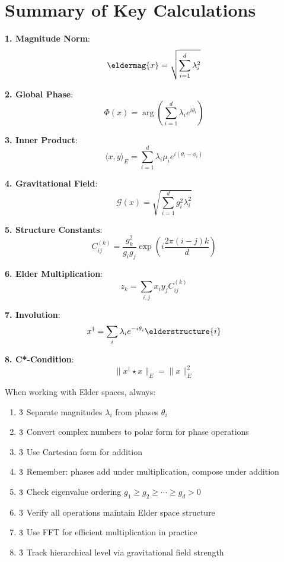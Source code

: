 \documentclass[12pt,a4paper]{article}
\newcommand{\checkmark}{\ding{51}}
\theoremstyle{definition}
\theoremstyle{remark}
\begin{document}
\newpage
\section{Summary of Key Calculations}

\begin{tcolorbox}[colback=blue!5!white,colframe=blue!75!black,title=Essential Formulas for Calculations]

\textbf{1. Magnitude Norm}:
$$\eldermag{x} = \sqrt{\sum_{i=1}^{d} \lambda_i^2}$$

\textbf{2. Global Phase}:
$$\Phi(x) = \arg\left(\sum_{i=1}^{d} \lambda_i e^{i\theta_i}\right)$$

\textbf{3. Inner Product}:
$$\langle x, y \rangle_E = \sum_{i=1}^{d} \lambda_i \mu_i e^{i(\theta_i - \phi_i)}$$

\textbf{4. Gravitational Field}:
$$\mathcal{G}(x) = \sqrt{\sum_{i=1}^{d} g_i^2 \lambda_i^2}$$

\textbf{5. Structure Constants}:
$$C_{ij}^{(k)} = \frac{g_k^2}{g_i g_j} \exp\left(i\frac{2\pi(i-j)k}{d}\right)$$

\textbf{6. Elder Multiplication}:
$$z_k = \sum_{i,j} x_i y_j C_{ij}^{(k)}$$

\textbf{7. Involution}:
$$x^{\dagger} = \sum_{i} \lambda_i e^{-i\theta_i} \elderstructure{i}$$

\textbf{8. C*-Condition}:
$$\|x^{\dagger} \star x\|_E = \|x\|_E^2$$
\end{tcolorbox}

\begin{tcolorbox}[colback=green!5!white,colframe=green!75!black,title=Calculation Checklist]

When working with Elder spaces, always:

\begin{enumerate}
\item $\checkmark$ Separate magnitudes $\lambda_i$ from phases $\theta_i$
\item $\checkmark$ Convert complex numbers to polar form for phase operations
\item $\checkmark$ Use Cartesian form for addition
\item $\checkmark$ Remember: phases add under multiplication, compose under addition
\item $\checkmark$ Check eigenvalue ordering $g_1 \geq g_2 \geq \cdots \geq g_d > 0$
\item $\checkmark$ Verify all operations maintain Elder space structure
\item $\checkmark$ Use FFT for efficient multiplication in practice
\item $\checkmark$ Track hierarchical level via gravitational field strength
\end{enumerate}
\end{tcolorbox}
\end{document}
